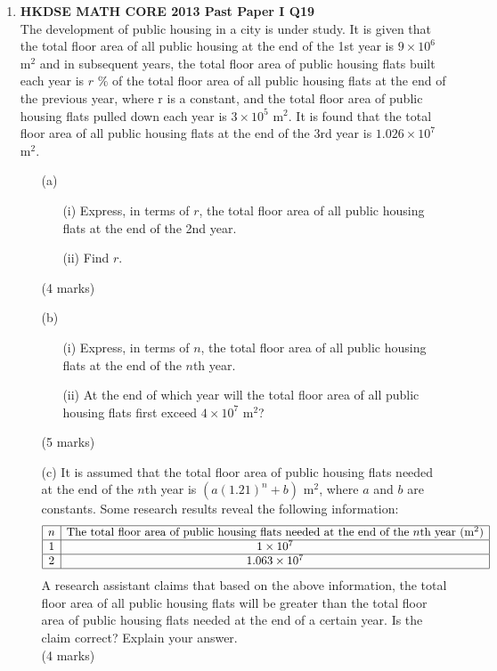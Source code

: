 \documentclass[12pt]{article}
\begin{document}
\begin{enumerate}
	\item \textbf{HKDSE MATH CORE 2013 Past Paper I Q19}\\
	The development of public housing in a city is under study. It is given that the total floor area of all public housing at the end of the 1st year is $9 \times 10^6$ m$^2$ and in subsequent years, the total floor area of public housing flats built each year is $r$ $\%$ of the total floor area of all public housing flats at the end of the previous year, where r is a constant, and the total floor area of public housing flats pulled down each year is $3 \times 10^5$ m$^2$. It is found that the total floor area of all public housing flats at the end of the 3rd year is $1.026 \times 10^7$ m$^2$.
	\begin{enumerate}
		\item[(a)]
		\begin{enumerate}
			\item[(i)] Express, in terms of $r$, the total floor area of all public housing flats at the end of the 2nd year.
			\item[(ii)] Find $r$.
		\end{enumerate}
		(4 marks)
		\item[(b)]
		\begin{enumerate}
			\item[(i)] Express, in terms of $n$, the total floor area of all public housing flats at the end of the $n$th year.
			\item[(ii)] At the end of which year will the total floor area of all public housing flats first exceed $4 \times 10^7$ m$^2$?
		\end{enumerate}
		(5 marks)
		\item[(c)] It is assumed that the total floor area of public housing flats needed at the end of the $n$th year is $(a(1.21)^n + b)$ m$^2$, where $a$ and $b$ are constants. Some research results reveal the following information:
		$$\begin{array}{|c|c|}
			\hline
			n & \text{The total floor area of public housing flats needed at the end of the $n$th year (m$^2$)} \\
			\hline
			1 & 1 \times 10^7\\
			\hline		
			2 & 1.063 \times 10^7\\
			\hline
		\end{array}$$		
		A research assistant claims that based on the above information, the total floor area of all public housing flats will be greater than the total floor area of public housing flats needed at the end of a certain year. Is the claim correct? Explain your answer. \\(4 marks)
	\end{enumerate}



\end{enumerate}
\end{document}

